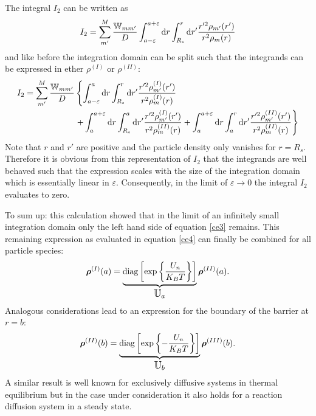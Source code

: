 The integral $I_2$ can be written as
\begin{equation}
    I_2 = \sum_{m'}^M\frac{\mathbb{W}_{mm'}}{D} \int_{a-\varepsilon}^{a+\varepsilon} {\rm d} r \int_{R_s}^{r} {\rm d} r' \frac{r'^2 \rho_{m'}(r')}{r^2\rho_m(r)}
    \label{ce7}
\end{equation}
and like before the integration domain can be split such that the integrands can be expressed in ether $\rho^{(I)}$ or $\rho^{(II)}$:
\begin{align}
    I_2 = \sum_{m'}^M\frac{\mathbb{W}_{mm'}}{D} & \left\{ \int_{a-\varepsilon}^{a} {\rm d} r \int_{R_s}^{r} {\rm d} r' \frac{r'^2 \rho^{(I)}_{m'}(r')}{r^2\rho^{(I)}_m(r)} \right. \nonumber \\ 
    &\left. + \int_{a}^{a+\varepsilon} {\rm d} r \int_{R_s}^{a} {\rm d} r' \frac{r'^2 \rho^{(I)}_{m'}(r')}{r^2\rho^{(II)}_m(r)} + \int_{a}^{a+\varepsilon} {\rm d} r \int_{a}^{r} {\rm d} r' \frac{r'^2 \rho^{(II)}_{m'}(r')}{r^2\rho^{(II)}_m(r)} \right\}
    \label{ce8}
\end{align}
Note that $r$ and $r'$ are positive and the particle density only vanishes for $r=R_s$. Therefore it is obvious from this representation of $I_2$ that the integrands are well behaved such that the expression scales with the size of the integration domain which is essentially linear in $\varepsilon$. Consequently, in the limit of $\varepsilon \rightarrow 0$ the integral $I_2$ evaluates to zero.
\par
To sum up: this calculation showed that in the limit of an infinitely small integration domain only the left hand side of equation \eqref{ce3} remains. This remaining expression as evaluated in equation \eqref{ce4} can finally be combined for all particle species:
\begin{equation}
    \boldsymbol{\mathbf{\rho}}^{(I)}(a) = \underbrace{ {\rm diag}\left[\exp\left\{\frac{U_n}{K_B T} \right\}\right]}_\text{\large$\mathbb{U}_a$} \boldsymbol{\mathbf{\rho}}^{(II)}(a).
    \label{dens_fit}
\end{equation}
Analogous considerations lead to an expression for the boundary of the barrier at $r=b$:
\begin{equation}
     \boldsymbol{\mathbf{\rho}}^{(II)}(b) = \underbrace{ {\rm diag}\left[\exp\left\{-\frac{U_n}{K_B T} \right\}\right]}_\text{\large$\mathbb{U}_b$} \boldsymbol{\mathbf{\rho}}^{(III)}(b).
    \label{dens_fit_b}
\end{equation}
A similar result is well known for exclusively diffusive systems in thermal equilibrium but in the case under consideration it also holds for a reaction diffusion system in a steady state. \\
